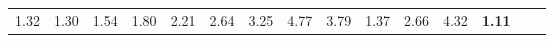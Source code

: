 \begin{tabular}{ll|rrrrrrrrr|rrrr}
  


  
  1.32 & 1.30 & 1.54 & 1.80 & 2.21 & 2.64 & 3.25 & 4.77 & 3.79 & 1.37 & 2.66 & 4.32 & \textbf{1.11} \\


\end{tabular}
